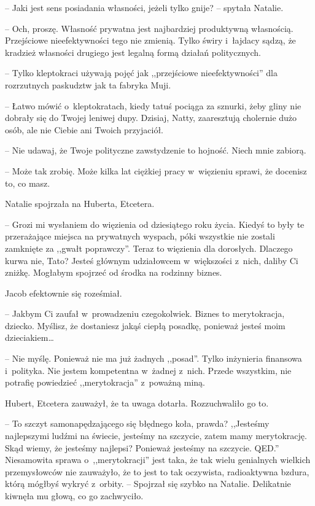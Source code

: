 \documentclass[oneside,polish,11pt,sfheadings]{mwbk}
\begin{document}
-- Jaki jest sens posiadania własności, jeżeli tylko gnije? -- spytała
Natalie.

-- Och, proszę. Własność prywatna jest najbardziej produktywną
własnością. Przejściowe nieefektywności tego nie zmienią. Tylko świry i~łajdacy sądzą, że kradzież własności drugiego jest legalną formą działań
politycznych.

-- Tylko kleptokraci używają pojęć jak ,,przejściowe nieefektywności''
dla rozrzutnych paskudztw jak ta fabryka Muji.

-- Łatwo mówić o~kleptokratach, kiedy tatuś pociąga za sznurki, żeby
gliny nie dobrały się do Twojej leniwej dupy. Dzisiaj, Natty,
zaaresztują cholernie dużo osób, ale nie Ciebie ani Twoich przyjaciół.

-- Nie udawaj, że Twoje polityczne zawstydzenie to hojność. Niech mnie
zabiorą.

-- Może tak zrobię. Może kilka lat ciężkiej pracy w~więzieniu sprawi, że
docenisz to, co masz.

Natalie spojrzała na Huberta, Etcetera. 

-- Grozi mi wysłaniem do
więzienia od dziesiątego roku życia. Kiedyś to były te przerażające
miejsca na prywatnych wyspach, póki wszystkie nie zostali zamknięte za
,,gwałt poprawczy''. Teraz to więzienia dla dorosłych. Dlaczego kurwa
nie, Tato? Jesteś głównym udziałowcem w~większości z~nich, daliby Ci
zniżkę. Mogłabym spojrzeć od środka na rodzinny biznes.

Jacob efektownie się roześmiał. 

-- Jakbym Ci zaufał w~prowadzeniu
czegokolwiek. Biznes to merytokracja, dziecko. Myślisz, że dostaniesz
jakąś ciepłą posadkę, ponieważ jesteś moim dzieciakiem\ldots 

-- Nie myślę. Ponieważ nie ma już żadnych ,,posad''. Tylko inżynieria
finansowa i~polityka. Nie jestem kompetentna w~żadnej z~nich. Przede
wszystkim, nie potrafię powiedzieć ,,merytokracja'' z~poważną miną.

Hubert, Etcetera zauważył, że ta uwaga dotarła. Rozzuchwaliło go to. 

-- To szczyt samonapędzającego się błędnego koła, prawda? ,,Jesteśmy
najlepszymi ludźmi na świecie, jesteśmy na szczycie, zatem mamy
merytokrację. Skąd wiemy, że jesteśmy najlepsi? Ponieważ jesteśmy na
szczycie. QED.'' Niesamowita sprawa o~,,merytokracji'' jest taka, że tak
wielu genialnych wielkich przemysłowców nie zauważyło, że to jest to tak
oczywista, radioaktywna bzdura, którą mógłbyś wykryć z~orbity. -- Spojrzał się szybko na Natalie. Delikatnie kiwnęła mu głową, co go
zachwyciło.
\end{document}
